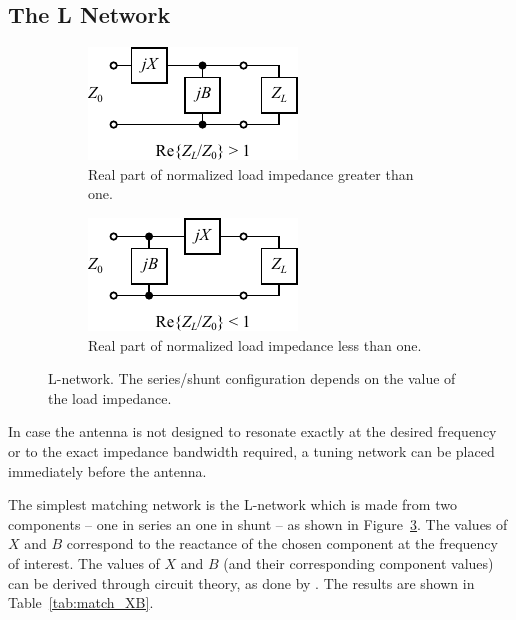 \subsection{The L Network}
\begin{figure}[htbp]
    \begin{subfigure}{0.49\linewidth}
        \centering
        \includegraphics{img/analysis/l_network_a}
        \caption{Real part of normalized load impedance greater than one.}
        \label{fig:l_network_a}
    \end{subfigure}
    \hfill
    \begin{subfigure}{0.49\linewidth}
        \centering
        \includegraphics{img/analysis/l_network_b}
        \caption{Real part of normalized load impedance less than one.}
        \label{fig:l_network_b}
    \end{subfigure}
    \caption{L-network. The series/shunt configuration depends on the value of the load impedance.}
    \label{fig:l_network}
\end{figure}
In case the antenna is not designed to resonate exactly at the desired frequency or to the exact impedance bandwidth required, a tuning network can be placed immediately before the antenna. 

The simplest matching network is the L-network which is made from two components -- one in series an one in shunt -- as shown in Figure~\ref{fig:l_network}. The values of $X$ and $B$ correspond to the reactance of the chosen component at the frequency of interest. The values of $X$ and $B$ (and their corresponding component values) can be derived through circuit theory, as done by \cite{pozar2011microwave}. The results are shown in Table~\ref{tab:match_XB}.


